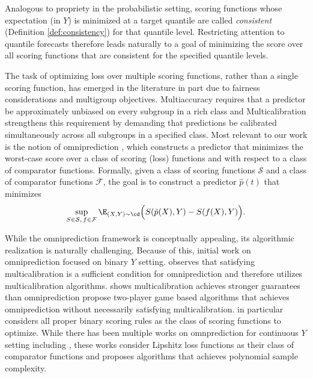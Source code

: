 Analogous to propriety in the probabilistic setting, scoring functions whose expectation (in $Y$) is minimized at a target quantile are called \emph{consistent} (Definition \ref{def:consistency}) for that quantile level. Restricting attention to quantile forecasts therefore leads naturally to a goal of minimizing the score over all scoring functions that are consistent for the specified quantile levels.

The task of optimizing loss over multiple scoring functions, rather than a single scoring function, has emerged in the literature in part due to fairness considerations and multigroup objectives. Multiaccuracy \cite{hebert2018multicalibration, kim2019multiaccuracy} requires that a predictor be approximately unbiased on every subgroup in a rich class and 
Multicalibration \cite{hebert2018multicalibration} strengthens this requirement by demanding that predictions be calibrated simultaneously across all subgroups in a specified class. Most relevant to our work is the notion of omniprediction \cite{gopalan2022omnipredictors}, which constructs a predictor that minimizes the worst-case score over a class of scoring (loss) functions and with respect to a class of comparator functions. Formally, given a class of scoring functions $\mathcal{S}$ and a class of comparator functions $\mathcal{F}$, the goal is to construct a predictor $\hat{p}(t)$ that minimizes
\begin{align}\label{eq:omni_objective}
    \sup_{S \in \mathcal{S},\, f \in \mathcal{F}} 
    \E_{(X,Y) \sim \cd} \Big( S(\hat{p}(X), Y) - S(f(X), Y) \Big).    
\end{align}

While the omniprediction framework is conceptually appealing, its algorithmic realization is naturally challenging. Because of this, initial work on omniprediction focused on binary $Y$ setting. \cite{gopalan2022omnipredictors, gopalan2023loss, garg2024oracle, okoroafor2025near} observes that satisfying multicalibration is a sufficient condition for omniprediction and therefore utilizes multicalibration algorithms. \cite{gopalan2023swap} shows multicalibration achieves stronger guarantees than omniprediction \cite{garg2024oracle, isaac2025omni} propose two-player game based algorithms that achieves omniprediction without necessarily satisfying multicalibration. \cite{isaac2025omni} in particular considers all proper binary scoring rules as the class of scoring functions to optimize. While there has been multiple works on omnprediction for continuous $Y$ setting including \cite{gopalan2024omni_regression, lu2025omni_nonlinear}, these works consider Lipshitz loss functions as their class of comparator functions and proposes algorithms that achieves polynomial sample complexity.


